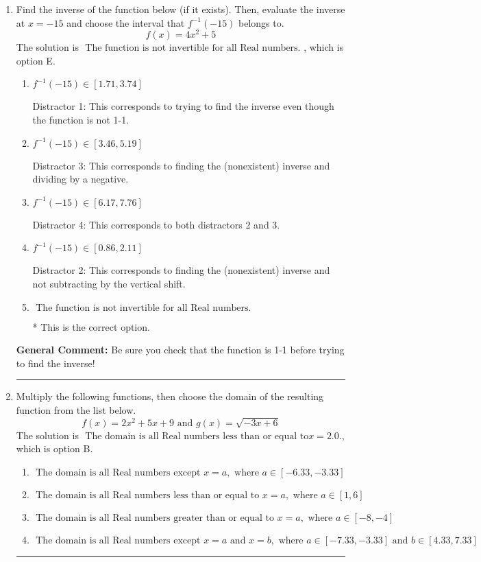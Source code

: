 \documentclass{extbook}[14pt]
\newcommand{\litem}[1]{\item #1

\rule{\textwidth}{0.4pt}}
\begin{document}
\begin{enumerate}\litem{
Find the inverse of the function below (if it exists). Then, evaluate the inverse at $x = -15$ and choose the interval that $f^{-1}(-15)$ belongs to.
\[ f(x) = 4 x^2 + 5 \]The solution is \( \text{ The function is not invertible for all Real numbers. } \), which is option E.\begin{enumerate}[label=\Alph*.]
\item \( f^{-1}(-15) \in [1.71, 3.74] \)

 Distractor 1: This corresponds to trying to find the inverse even though the function is not 1-1. 
\item \( f^{-1}(-15) \in [3.46, 5.19] \)

 Distractor 3: This corresponds to finding the (nonexistent) inverse and dividing by a negative.
\item \( f^{-1}(-15) \in [6.17, 7.76] \)

 Distractor 4: This corresponds to both distractors 2 and 3.
\item \( f^{-1}(-15) \in [0.86, 2.11] \)

 Distractor 2: This corresponds to finding the (nonexistent) inverse and not subtracting by the vertical shift.
\item \( \text{ The function is not invertible for all Real numbers. } \)

* This is the correct option.
\end{enumerate}

\textbf{General Comment:} Be sure you check that the function is 1-1 before trying to find the inverse!
}
\litem{
Multiply the following functions, then choose the domain of the resulting function from the list below.
\[ f(x) = 2x^{2} +5 x + 9 \text{ and } g(x) = \sqrt{-3x+6}  \]The solution is \( \text{ The domain is all Real numbers less than or equal to} x = 2.0. \), which is option B.\begin{enumerate}[label=\Alph*.]
\item \( \text{ The domain is all Real numbers except } x = a, \text{ where } a \in [-6.33, -3.33] \)


\item \( \text{ The domain is all Real numbers less than or equal to } x = a, \text{ where } a \in [1, 6] \)


\item \( \text{ The domain is all Real numbers greater than or equal to } x = a, \text{ where } a \in [-8, -4] \)


\item \( \text{ The domain is all Real numbers except } x = a \text{ and } x = b, \text{ where } a \in [-7.33, -3.33] \text{ and } b \in [4.33, 7.33] \)



\end{enumerate}}
\end{enumerate}
\end{document}

